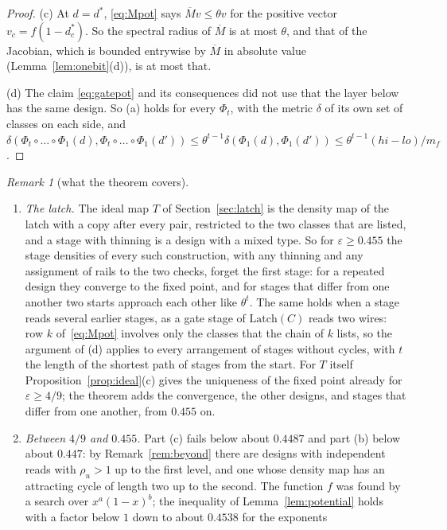 \documentclass[11pt]{amsart}
\theoremstyle{definition}
\theoremstyle{remark}
\newtheorem{remark}[theorem]{Remark}
\newcommand{\eps}{\varepsilon}
\begin{document}
\begin{proof}
(c) At $d=d^*$, \eqref{eq:Mpot} says $\overline Mv\le\theta v$ for the positive vector
$v_c=f(1-d^*_c)$. So the spectral radius of $\overline M$ is at most $\theta$, and that of the
Jacobian, which is bounded entrywise by $\overline M$ in absolute value
(Lemma~\ref{lem:onebit}(d)), is at most that.

(d) The claim \eqref{eq:gatepot} and its consequences did not use that the layer below has the
same design. So (a) holds for every $\Phi_t$, with the metric $\delta$ of its own set of classes
on each side, and
$\delta(\Phi_t\circ\dots\circ\Phi_1(d),\Phi_t\circ\dots\circ\Phi_1(d'))\le\theta^{t-1}\delta(\Phi_1(d),\Phi_1(d'))\le\theta^{t-1}(hi-lo)/m_f$.
\end{proof}

\begin{remark}[what the theorem covers]\label{rem:indep}
\begin{enumerate}[label=(\roman*),leftmargin=2.4em]
\item \emph{The latch.} The ideal map $T$ of Section~\ref{sec:latch} is the density map of the
latch with a copy after every pair, restricted to the two classes that are listed, and a stage
with thinning is a design with a mixed type. So for $\eps\ge0.455$ the stage densities of every
such construction, with any thinning and any assignment of rails to the two checks, forget the
first stage: for a repeated design they converge to the fixed point, and for stages that differ
from one another two starts approach each other like $\theta^t$. The same holds when a stage reads
several earlier stages, as a gate stage of $\mathrm{Latch}(C)$ reads two wires: row $k$
of~\eqref{eq:Mpot} involves only the classes that the chain of $k$ lists, so the argument of (d)
applies to every arrangement of stages without cycles, with $t$ the length of the shortest path
of stages from the start. For $T$ itself Proposition~\ref{prop:ideal}(c) gives the uniqueness of
the fixed point already for $\eps\ge4/9$; the theorem adds the convergence, the other designs, and
stages that differ from one another, from $0.455$ on.
\item \emph{Between $4/9$ and $0.455$.} Part (c) fails below about $0.4487$ and part (b) below
about $0.447$: by Remark~\ref{rem:beyond} there are designs with independent reads with $\rho_u>1$
up to the first level, and one whose density map has an attracting cycle of length two up to the
second. The function $f$ was found by a search over $x^a(1-x)^b$; the inequality of
Lemma~\ref{lem:potential} holds with a factor below $1$ down to about $0.4538$ for the exponents

\end{enumerate}
\end{remark}
\end{document}
